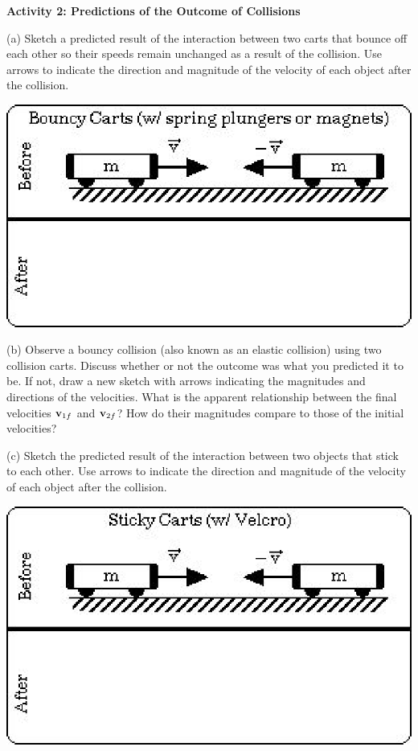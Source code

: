 \textbf{Activity 2: Predictions of the Outcome of Collisions }

(a) Sketch a predicted result of the interaction between two carts that bounce
off each other so their speeds remain unchanged as a result of the collision.
Use arrows to indicate the direction and magnitude of the velocity of each object after the collision.

\vspace{0.3cm}
{\par\centering \includegraphics{mom_cons/mom_cons_fig3.eps} \par}
\vspace{0.3cm}

(b) Observe a bouncy collision (also known as an elastic collision) using two collision carts. Discuss whether or not the outcome was what you predicted it to be. If not, draw a new sketch with arrows indicating the magnitudes and directions of the velocities. What is the apparent relationship between the final velocities \( {{\bf v}_{1f}} \) and \( {{\bf v}_{2f}} \)? How do their magnitudes compare to those of the initial velocities?
\vspace{20mm}

(c) Sketch the predicted result of the interaction between two objects that
stick to each other. Use arrows to indicate the direction and magnitude of the velocity
of each object after the collision.

\vspace{0.3cm}
{\par\centering \includegraphics{mom_cons/mom_cons_fig4.eps} \par}
\vspace{0.3cm}

